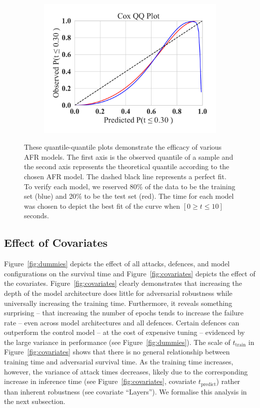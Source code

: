 \begin{figure}
\begin{subfigure}
	\end{subfigure}
	~
	\begin{subfigure}
		\centering
		\includegraphics[width=.30\textwidth,trim={20pt 20pt 20pt 20pt},clip]{plots/cox_qq.pdf}
	\end{subfigure}
	\caption{These quantile-quantile plots demonstrate the efficacy of various AFR models. The first axis is the observed quantile of a sample and the second axis represents the theoretical quantile according to the chosen AFR model. The dashed black line represents a perfect fit. To verify each model, we reserved 80\% of the data to be the training set (blue) and 20\% to be the test set (red). The time for each model was chosen to depict the best fit of the curve when $ [ 0 \geq t \leq 10 ] $ seconds. 
 }
	\label{fig:afr_models}
\end{figure}

\subsection{Effect of Covariates}
Figure~\ref{fig:dummies} depicts the effect of all attacks, defences, and model configurations on the survival time and Figure~\ref{fig:covariates} depicts the effect of the covariates. 
Figure~\ref{fig:covariates} clearly demonstrates that increasing the depth of the model architecture does little for adversarial robustness while universally increasing the training time. 
Furthermore, it reveals something surprising -- that increasing the number of epochs tends to increase the failure rate -- even across model architectures and all defences. 
Certain defences can outperform the control model -- at the cost of expensive tuning -- evidenced by the large variance in performance (see Figure~\ref{fig:dummies}). The scale of $t_{\mathrm{train}}$  in Figure~\ref{fig:covariates} shows that there is no general relationship between training time and adversarial survival time. 
As the training time increases, however, the variance of attack times decreases, likely due to the corresponding increase in inference time (see Figure~\ref{fig:covariates}, covariate $t_{\mathrm{predict}}$) rather than inherent robustness (see covariate ``Layers'').
We formalise this analysis in the next subsection.

